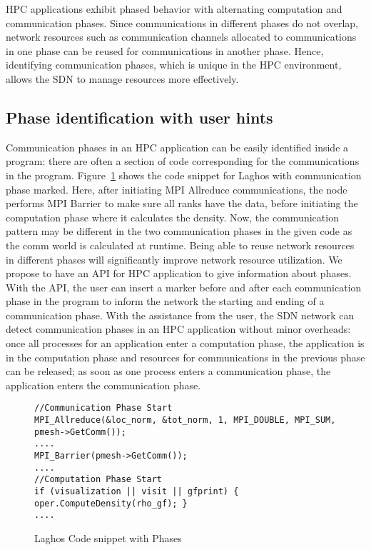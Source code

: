 
HPC applications exhibit phased behavior with alternating
computation and communication phases. Since communications in different
phases do not overlap, network resources such as communication channels
allocated to communications in one phase can be reused for communications
in another phase. Hence, identifying communication phases, which is unique
in the HPC environment, allows the SDN to manage resources more effectively.

\subsection{Phase identification with user hints}

Communication phases in an HPC application can be easily identified
inside a program: there are often a section of code corresponding
for the communications in the program. Figure~\ref{code.laghos.1}
shows the code snippet for Laghos with communication phase marked. 
Here, after initiating MPI Allreduce
communications, the node performs MPI Barrier to make sure all ranks 
have the data, before initiating the computation phase where
it calculates the density.
Now, the communication pattern may be different in the two
communication phases in the given code as the comm world is calculated
at runtime. Being able to reuse network resources in different phases will
significantly improve network resource utilization. 
We propose to have an API for HPC application to give
information about phases. With the API, the user can insert a marker before
and after each communication
phase in the program to inform the network the starting and
ending of a communication phase. With the assistance from the user,
the SDN network can detect communication phases in an HPC application
without minor overheads: once all processes for an application
enter a computation phase, the application is in the computation phase and
resources for communications in the previous phase can be released; as
soon as one process enters a communication phase, the application enters
the communication phase. 

\begin{figure}[hbtp]
\begin{lstlisting}[breaklines]
//Communication Phase Start
MPI_Allreduce(&loc_norm, &tot_norm, 1, MPI_DOUBLE, MPI_SUM, pmesh->GetComm());
.... 
MPI_Barrier(pmesh->GetComm());
....
//Computation Phase Start
if (visualization || visit || gfprint) { oper.ComputeDensity(rho_gf); }
....
\end{lstlisting}
\caption{Laghos Code snippet with Phases}
\label{code.laghos.1} 
\end{figure}

